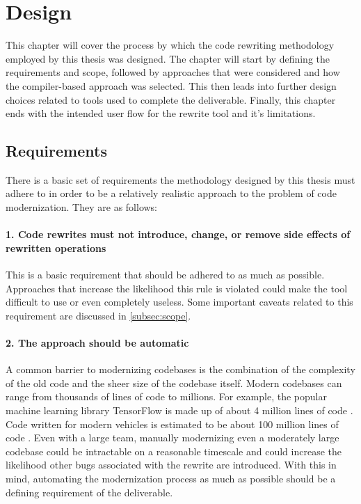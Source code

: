\chapter{Design}
\label{sec:design}

This chapter will cover the process by which the code rewriting methodology employed by this thesis was designed. The chapter will start by defining the requirements and scope, followed by approaches that were considered and how the compiler-based approach was selected. This then leads into further design choices related to tools used to complete the deliverable. Finally, this chapter ends with the intended user flow for the rewrite tool and it's limitations.

\section{Requirements}

There is a basic set of requirements the methodology designed by this thesis must adhere to in order to be a relatively realistic approach to the problem of code modernization. They are as follows:

\subsubsection{1. Code rewrites must not introduce, change, or remove side effects of rewritten operations}

This is a basic requirement that should be adhered to as much as possible. Approaches that increase the likelihood this rule is violated could make the tool difficult to use or even completely useless. Some important caveats related to this requirement are discussed in \ref{subsec:scope}.

\subsubsection{2. The approach should be automatic}

A common barrier to modernizing codebases is the combination of the complexity of the old code and the sheer size of the codebase itself. Modern codebases can range from thousands of lines of code to millions. For example, the popular machine learning library TensorFlow is made up of about 4 million lines of code \cite{tf_loc}. Code written for modern vehicles is estimated to be about 100 million lines of code \cite{car_loc}. Even with a large team, manually modernizing even a moderately large codebase could be intractable on a reasonable timescale and could increase the likelihood other bugs associated with the rewrite are introduced. With this in mind, automating the modernization process as much as possible should be a defining requirement of the deliverable.

